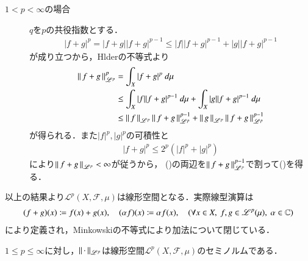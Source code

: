 \begin{prf}
\begin{description}
		\item[$1 < p < \infty$の場合]
			$q$を$p$の共役指数とする．
			\begin{align}
				|f+g|^p = |f+g||f+g|^{p-1} \leq |f||f+g|^{p-1} + |g||f+g|^{p-1}
			\end{align}
			が成り立つから，Hlderの不等式より
			\begin{align}
				\Norm{f+g}{\mathscr{L}^p}^p &= \int_{X} |f+ g|^p\ d\mu \\
				&\leq \int_{X} |f||f+g|^{p-1}\ d\mu + \int_{X} |g||f+g|^{p-1}\ d\mu \\
				&\leq \Norm{f}{\mathscr{L}^p}\Norm{f+g}{\mathscr{L}^p}^{p-1} + \Norm{g}{\mathscr{L}^p}\Norm{f+g}{\mathscr{L}^p}^{p-1}
				\label{Minkowski_1}
			\end{align}
			が得られる．また$|f|^p,|g|^p$の可積性と
			\begin{align}
				|f + g|^p \leq 2^p \left( |f|^p + |g|^p \right)
			\end{align}
			により$\left\|\, f+g\, \right\|_{\mathscr{L}^p} < \infty$が従うから，
			()の両辺を$\left\|\, f+g\, \right\|_{\mathscr{L}^p}^{p-1}$で割って()を得る．
			\QED
	\end{description}
\end{prf}

以上の結果より$\mathscr{L}^p(X,\mathscr{F},\mu)$は線形空間となる．実際線型演算は
\begin{align}
	(f+g)(x) \coloneqq f(x) + g(x), \quad (\alpha f)(x) \coloneqq \alpha f(x),
	\quad (\forall x \in X,\ f,g \in \mathscr{L}^p(\mu),\ \alpha \in \mathbb{C})
\end{align}
により定義され，Minkowskiの不等式により加法について閉じている．

\begin{screen}
	\begin{lem}
		$1 \leq p \leq \infty$に対し，$\left\|\, \cdot\, \right\|_{\mathscr{L}^p}$は線形空間$\mathscr{L}^p(X,\mathscr{F},\mu)$のセミノルムである．
	\end{lem}
\end{screen}

